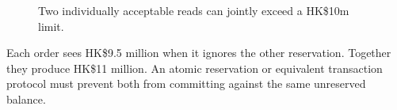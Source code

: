 \begin{figure}[H]
\centering
{}
\caption{Two individually acceptable reads can jointly exceed a HK\$10m limit.}\label{fig:teach-P-03d-java-delivery-05}
\end{figure}

Each order sees HK\$9.5 million when it ignores the other reservation. Together they produce HK\$11 million. An atomic reservation or equivalent transaction protocol must prevent both from committing against the same unreserved balance.

